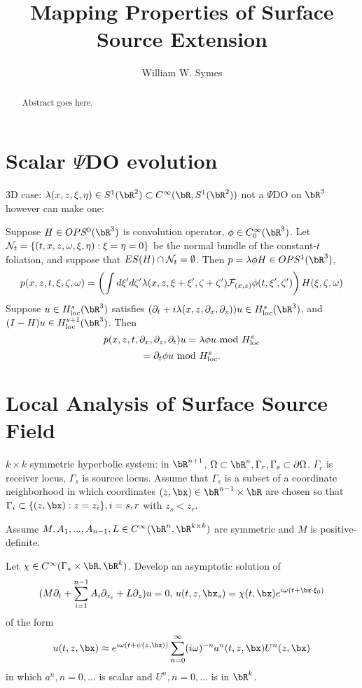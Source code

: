 \title{Mapping Properties of Surface Source Extension}
\author{William W. Symes}

\begin{abstract}
  Abstract goes here.
\end{abstract}

\section{Scalar $\Psi$DO evolution}

3D case: $\lambda(x,z,\xi,\eta) \in S^1(\bR^2) \subset
C^{\infty}(\bR,S^1(\bR^2))$ not a $\Psi$DO on $\bR^3$ however can make
one:

Suppose $H \in OPS^0(\bR^3)$ is convolution operator, $\phi \in
C^{\infty}_0(\bR^3)$. Let ${\cal N}_t = \{(t,x,z,\omega,\xi,\eta):
\xi=\eta=0\}$ be the normal bundle of the constant-$t$ foliation, and
suppose that $ES(H) \cap {\cal N}_t = \emptyset$. Then $p = \lambda \phi H
\in OPS^1(\bR^3)$,
\[
p(x,z,t,\xi,\zeta,\omega) = \left(\int d\xi' d\zeta'
\lambda(x,z,\xi+\xi',\zeta+\zeta'){\cal
  F}_{(x,z)}\phi(t,\xi',\zeta')\right)H(\xi,\zeta,\omega)
\]
Suppose $u \in H^s_{\rm loc}(\bR^3)$ satisfies $(\partial_t + i\lambda(x,z,\partial_x,\partial_z))u \in
H^s_{\rm loc}(\bR^3)$, and $(I-H)u \in H^{s+1}_{\rm loc}(\bR^3)$.
Then
\[
  p(x,z,t,\partial_x,\partial_z,\partial_t)u = \lambda \phi u \mbox{
    mod } H^{s}_{\rm loc}
\]
\[
  = \partial_t \phi u \mbox{ mod } H^{s}_{\rm loc}.
\]



\section{Local Analysis of Surface Source Field}
$k \times  k$ symmetric hyperbolic system: in $\bR^{n+1}$, $\Omega
\subset \bR^n, \Gamma_r, \Gamma_s \subset \partial \Omega$. $\Gamma_r$
is receiver locus, $\Gamma_s$ is sourcee locus. Assume that $\Gamma_s$
is a subset of a coordinate neighborhood in  which coordinates
$(z,\bx) \in \bR^{n-1} \times \bR$ are
chosen so that $\Gamma_i\subset \{(z,\bx): z=z_i\}, i=s,r$ with $z_s <
z_r$.

Assume $M, A_1,...,A_{n-1}, L \in C^{\infty}(\bR^n, \bR^{k\times k})$
are symmetric and $M$ is positive-definite.

Let $\chi \in C^{\infty}(\Gamma_s \times \bR, \bR^k)$.
Develop an asymptotic solution of
\begin{equation}
  \label{eqn:shs}
  (M\partial_t + \sum_{i=1}^{n-1}A_i \partial_{x_i} + L \partial_z)
  u = 0,\, u(t,z,\bx_s) = \chi(t,\bx)e^{i\omega(t + \bx \cdot \xi_0)}
\end{equation}
of the form
\begin{equation}
  \label{eqn:hfa}
  u(t,z,\bx) \approx e^{i\omega(t + \psi(z,\bx))} \sum_{n=0}^{\infty}
  (i\omega)^{-n}a^n(t,z,\bx) U^n(z,\bx)
\end{equation}
in which $a^n, n=0,...$ is scalar and $U^n, n=0,...$ is in $\bR^k$. 

